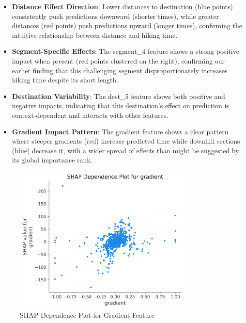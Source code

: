 \documentclass[12pt]{article}
\begin{document}
\begin{itemize}
  \item \textbf{Distance Effect Direction}: Lower distances to destination (blue points) consistently push predictions downward (shorter times), while greater distances (red points) push predictions upward (longer times), confirming the intuitive relationship between distance and hiking time.
  
  \item \textbf{Segment-Specific Effects}: The segment\_4 feature shows a strong positive impact when present (red points clustered on the right), confirming our earlier finding that this challenging segment disproportionately increases hiking time despite its short length.
  
  \item \textbf{Destination Variability}: The dest\_5 feature shows both positive and negative impacts, indicating that this destination's effect on prediction is context-dependent and interacts with other features.
  
  \item \textbf{Gradient Impact Pattern}: The gradient feature shows a clear pattern where steeper gradients (red) increase predicted time while downhill sections (blue) decrease it, with a wider spread of effects than might be suggested by its global importance rank.
\end{itemize}

\begin{figure}[H]
\centering
\includegraphics[width=0.8\textwidth]{visualization_results/shap_dependence_gradient.png}
\caption{SHAP Dependence Plot for Gradient Feature}
\label{fig:shap_gradient}
\end{figure}
\end{document}
